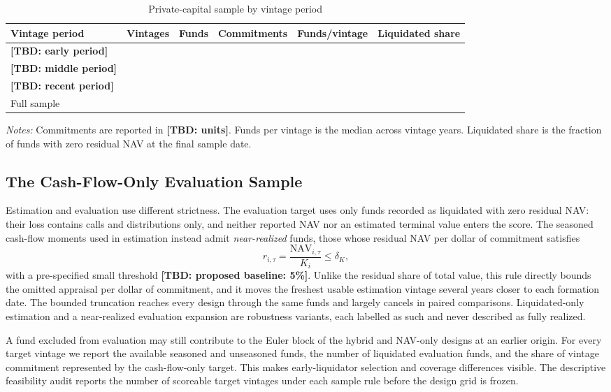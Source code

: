 \documentclass[11pt]{article}
\newcommand{\tbd}[1]{\textbf{[TBD: #1]}}
\begin{document}
\begin{table}[htbp]
\centering
\caption{Private-capital sample by vintage period}
\label{tab:sample}
\small
\begin{tabular}{lrrrrr}
\toprule
Vintage period & Vintages & Funds & Commitments & Funds/vintage & Liquidated share \\
\midrule
\tbd{early period}  & & & & & \\
\tbd{middle period} & & & & & \\
\tbd{recent period} & & & & & \\
\midrule
Full sample & & & & & \\
\bottomrule
\end{tabular}
\begin{minipage}{0.94\textwidth}
\footnotesize \emph{Notes:} Commitments are reported in \tbd{units}. Funds per
vintage is the median across vintage years. Liquidated share is the fraction
of funds with zero residual NAV at the final sample date.
\end{minipage}
\end{table}

\subsection{The Cash-Flow-Only Evaluation Sample}

Estimation and evaluation use different strictness. The evaluation target uses
only funds recorded as liquidated with zero residual NAV: their loss contains
calls and distributions only, and neither reported NAV nor an estimated
terminal value enters the score. The seasoned cash-flow moments used in
estimation instead admit \emph{near-realized} funds, those whose residual NAV
per dollar of commitment satisfies
\[
r_{i,\tau}=\frac{\mathrm{NAV}_{i,\tau}}{K_i}\leq\delta_K,
\]
with a pre-specified small threshold \tbd{proposed baseline: 5\%}. Unlike the
residual share of total value, this rule directly bounds the omitted appraisal
per dollar of commitment, and it moves the freshest usable estimation vintage
several years closer to each formation date. The bounded truncation reaches
every design through the same funds and largely cancels in paired
comparisons. Liquidated-only estimation and a near-realized evaluation
expansion are robustness variants, each labelled as such and never described
as fully realized.

A fund excluded from evaluation may still contribute to the Euler block of
the hybrid and NAV-only designs at an earlier origin. For every target
vintage we report the available seasoned and unseasoned funds, the number of
liquidated evaluation funds, and the share of vintage commitment represented
by the cash-flow-only target. This makes early-liquidator selection and
coverage differences visible. The descriptive feasibility audit reports the
number of scoreable target vintages under each sample rule before the design
grid is frozen.
\end{document}
